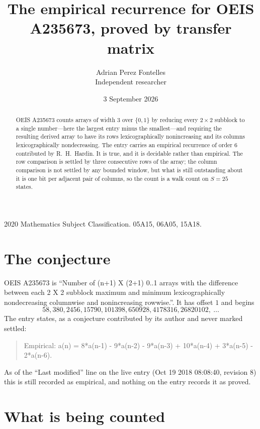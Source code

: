 \documentclass[11pt,a4paper]{article}
\title{The empirical recurrence for OEIS A235673, proved by transfer matrix}
\author{Adrian Perez Fontelles\\ \small Independent researcher}
\date{3 September 2026}
\theoremstyle{plain}
\theoremstyle{definition}
\begin{document}
\maketitle

\begin{abstract}
OEIS A235673 counts arrays of width $3$ over $\{0,1\}$ by reducing every $2\times2$ subblock to a
single number---here the largest entry minus the smallest---and requiring the resulting derived array to have its rows
lexicographically nonincreasing and its columns lexicographically nondecreasing. The entry carries an
empirical recurrence of order $6$ contributed by R.~H.~Hardin. It is true, and it is
decidable rather than empirical. The row comparison is settled by three consecutive rows of the
array; the column comparison is not settled by any bounded window, but what is still outstanding
about it is one bit per adjacent pair of columns, so the count is a walk count on $S=25$
states.
\end{abstract}

\noindent\small 2020 Mathematics Subject Classification. 05A15, 06A05, 15A18.\normalsize

\section{The conjecture}

OEIS A235673 is ``Number of (n+1) X (2+1) 0..1 arrays with the difference between each 2 X 2 subblock maximum and minimum lexicographically nondecreasing columnwise and nonincreasing rowwise.''. It has offset $1$ and begins
\[
58, 380, 2456, 15790, 101398, 650928, 4178316, 26820102,\ \dots
\]
The entry states, as a conjecture contributed by its author and never marked settled:
\begin{quote}
Empirical: a(n) = 8*a(n-1) - 9*a(n-2) - 9*a(n-3) + 10*a(n-4) + 3*a(n-5) - 2*a(n-6).
\end{quote}
As of the ``Last modified'' line on the live entry (Oct 19 2018 08:08:40, revision 8) this is still
recorded as empirical, and nothing on the entry records it as proved.

\section{What is being counted}
\end{document}

